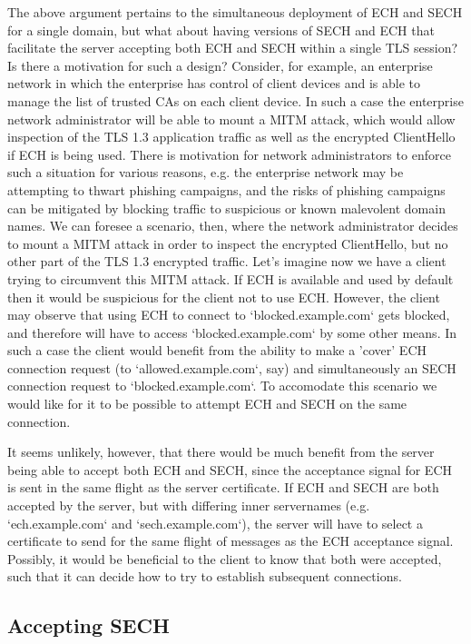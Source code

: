 The above argument pertains to the simultaneous deployment of ECH and SECH for a single domain, but what about having versions of SECH and ECH that facilitate the server accepting both ECH and SECH within a single TLS session? Is there a motivation for such a design? Consider, for example, an enterprise network in which the enterprise has control of client devices and is able to manage the list of trusted CAs on each client device. In such a case the enterprise network administrator will be able to mount a MITM attack, which would allow inspection of the TLS 1.3 application traffic as well as the encrypted ClientHello if ECH is being used. There is motivation for network administrators to enforce such a situation for various reasons, e.g. the enterprise network may be attempting to thwart phishing campaigns, and the risks of phishing campaigns can be mitigated by blocking traffic to suspicious or known malevolent domain names. We can foresee a scenario, then, where the network administrator decides to mount a MITM attack in order to inspect the encrypted ClientHello, but no other part of the TLS 1.3 encrypted traffic. Let's imagine now we have a client trying to circumvent this MITM attack. If ECH is available and used by default then it would be suspicious for the client not to use ECH. However, the client may observe that using ECH to connect to `blocked.example.com` gets blocked, and therefore will have to access `blocked.example.com` by some other means. In such a case the client would benefit from the ability to make a 'cover' ECH connection request (to `allowed.example.com`, say) and simultaneously an SECH connection request to `blocked.example.com`. To accomodate this scenario we would like for it to be possible to attempt ECH and SECH on the same connection.

It seems unlikely, however, that there would be much benefit from the server being able to accept both ECH and SECH, since the acceptance signal for ECH is sent in the same flight as the server certificate. If ECH and SECH are both accepted by the server, but with differing inner servernames (e.g. `ech.example.com` and `sech.example.com`), the server will have to select a certificate to send for the same flight of messages as the ECH acceptance signal. Possibly, it would be beneficial to the client to know that both were accepted, such that it can decide how to try to establish subsequent connections. 

\subsection{Accepting SECH}

